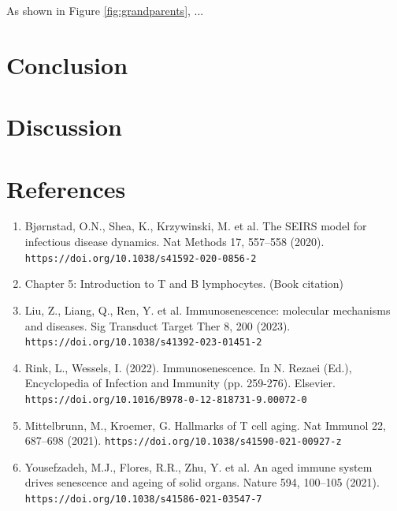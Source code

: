 \documentclass{article}
\begin{document}
As shown in Figure \ref{fig:grandparents}, ...

\section{Conclusion}

\section{Discussion}

\section*{References}

\begin{enumerate}
    \item Bjørnstad, O.N., Shea, K., Krzywinski, M. et al. The SEIRS model for infectious disease dynamics. Nat Methods 17, 557–558 (2020). \texttt{https://doi.org/10.1038/s41592-020-0856-2}
    
    \item Chapter 5: Introduction to T and B lymphocytes. (Book citation)
    
    \item Liu, Z., Liang, Q., Ren, Y. et al. Immunosenescence: molecular mechanisms and diseases. Sig Transduct Target Ther 8, 200 (2023). \texttt{https://doi.org/10.1038/s41392-023-01451-2}
    
    \item Rink, L., Wessels, I. (2022). Immunosenescence. In N. Rezaei (Ed.), Encyclopedia of Infection and Immunity (pp. 259-276). Elsevier. \texttt{https://doi.org/10.1016/B978-0-12-818731-9.00072-0}
    
    \item Mittelbrunn, M., Kroemer, G. Hallmarks of T cell aging. Nat Immunol 22, 687–698 (2021). \texttt{https://doi.org/10.1038/s41590-021-00927-z}
    
    \item Yousefzadeh, M.J., Flores, R.R., Zhu, Y. et al. An aged immune system drives senescence and ageing of solid organs. Nature 594, 100–105 (2021). \texttt{https://doi.org/10.1038/s41586-021-03547-7}
\end{enumerate}
\end{document}
